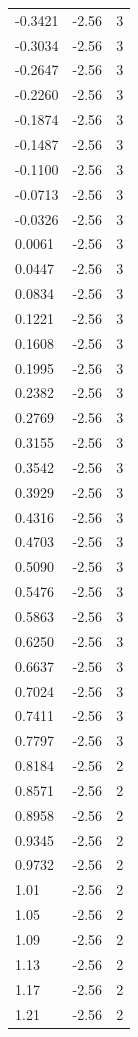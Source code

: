 \begin{longtable}{lrr}
  -0.3421 & -2.56 & 3 \\
  -0.3034 & -2.56 & 3 \\
  -0.2647 & -2.56 & 3 \\
  -0.2260 & -2.56 & 3 \\
  -0.1874 & -2.56 & 3 \\
  -0.1487 & -2.56 & 3 \\
  -0.1100 & -2.56 & 3 \\
  -0.0713 & -2.56 & 3 \\
  -0.0326 & -2.56 & 3 \\
  0.0061 & -2.56 & 3 \\
  0.0447 & -2.56 & 3 \\
  0.0834 & -2.56 & 3 \\
  0.1221 & -2.56 & 3 \\
  0.1608 & -2.56 & 3 \\
  0.1995 & -2.56 & 3 \\
  0.2382 & -2.56 & 3 \\
  0.2769 & -2.56 & 3 \\
  0.3155 & -2.56 & 3 \\
  0.3542 & -2.56 & 3 \\
  0.3929 & -2.56 & 3 \\
  0.4316 & -2.56 & 3 \\
  0.4703 & -2.56 & 3 \\
  0.5090 & -2.56 & 3 \\
  0.5476 & -2.56 & 3 \\
  0.5863 & -2.56 & 3 \\
  0.6250 & -2.56 & 3 \\
  0.6637 & -2.56 & 3 \\
  0.7024 & -2.56 & 3 \\
  0.7411 & -2.56 & 3 \\
  0.7797 & -2.56 & 3 \\
  0.8184 & -2.56 & 2 \\
  0.8571 & -2.56 & 2 \\
  0.8958 & -2.56 & 2 \\
  0.9345 & -2.56 & 2 \\
  0.9732 & -2.56 & 2 \\
  1.01 & -2.56 & 2 \\
  1.05 & -2.56 & 2 \\
  1.09 & -2.56 & 2 \\
  1.13 & -2.56 & 2 \\
  1.17 & -2.56 & 2 \\
  1.21 & -2.56 & 2 \\

\end{longtable}
